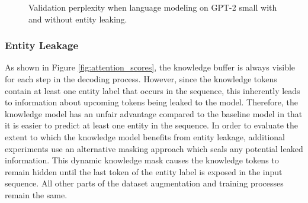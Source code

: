 \documentclass[phd,electronic,oneside,twosidetoc,letterpaper,chaptercenter,parttop,lof]{byumsphd}
\begin{document}
\begin{figure}
\centering
{}  
    \caption[Addressing entity leakage]{
        Validation perplexity when language modeling on GPT-2 small with and without entity leaking.
    }
    \label{fig:sealed}
\end{figure}

\subsubsection{Entity Leakage}

As shown in Figure \ref{fig:attention_scores}, the knowledge buffer is always visible for each step in the decoding process. 
However, since the knowledge tokens contain at least one entity label that occurs in the sequence, this inherently leads to information about upcoming tokens being leaked to the model.
Therefore, the knowledge model has an unfair advantage compared to the baseline model in that it is easier to predict at least one entity in the sequence.
In order to evaluate the extent to which the knowledge model benefits from entity leakage, additional experiments use an alternative masking approach which seals any potential leaked information.
This dynamic knowledge mask causes the knowledge tokens to remain hidden until the last token of the entity label is exposed in the input sequence. 
All other parts of the dataset augmentation and training processes remain the same.
\end{document}
